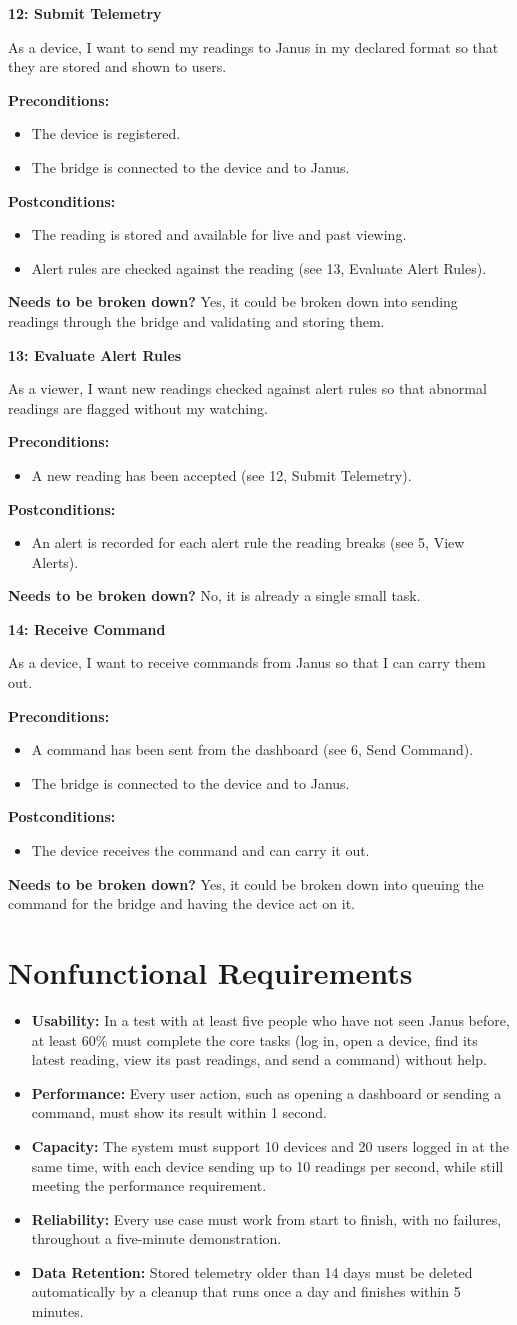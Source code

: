 \documentclass[11pt]{article}
\newcommand{\userstory}[6]{%
  \par\begin{samepage}\medskip\noindent\textbf{#1: #2}\par\nopagebreak
  \noindent #3\par\nopagebreak\smallskip
  \noindent\textbf{Preconditions:}
  \begin{itemize}[leftmargin=1.5em]#4\end{itemize}
  \noindent\textbf{Postconditions:}
  \begin{itemize}[leftmargin=1.5em]#5\end{itemize}
  \noindent\textbf{Needs to be broken down?} #6\par\end{samepage}
}
\begin{document}
\userstory{12}{Submit Telemetry}
{As a device, I want to send my readings to Janus in my declared format so that they are stored and shown to users.}
{\item The device is registered.
 \item The bridge is connected to the device and to Janus.}
{\item The reading is stored and available for live and past viewing.
 \item Alert rules are checked against the reading (see 13, Evaluate Alert Rules).}
{Yes, it could be broken down into sending readings through the bridge and validating and storing them.}

\userstory{13}{Evaluate Alert Rules}
{As a viewer, I want new readings checked against alert rules so that abnormal readings are flagged without my watching.}
{\item A new reading has been accepted (see 12, Submit Telemetry).}
{\item An alert is recorded for each alert rule the reading breaks (see 5, View Alerts).}
{No, it is already a single small task.}

\userstory{14}{Receive Command}
{As a device, I want to receive commands from Janus so that I can carry them out.}
{\item A command has been sent from the dashboard (see 6, Send Command).
 \item The bridge is connected to the device and to Janus.}
{\item The device receives the command and can carry it out.}
{Yes, it could be broken down into queuing the command for the bridge and having the device act on it.}

\section{Nonfunctional Requirements}

\begin{itemize}[leftmargin=0pt, itemsep=0.6em, label={}]
\item \textbf{Usability:} In a test with at least five people who have not seen Janus before, at least 60\% must complete the core tasks (log in, open a device, find its latest reading, view its past readings, and send a command) without help.
\item \textbf{Performance:} Every user action, such as opening a dashboard or sending a command, must show its result within 1 second.
\item \textbf{Capacity:} The system must support 10 devices and 20 users logged in at the same time, with each device sending up to 10 readings per second, while still meeting the performance requirement.
\item \textbf{Reliability:} Every use case must work from start to finish, with no failures, throughout a five-minute demonstration.
\item \textbf{Data Retention:} Stored telemetry older than 14 days must be deleted automatically by a cleanup that runs once a day and finishes within 5 minutes.
\end{itemize}
\end{document}
